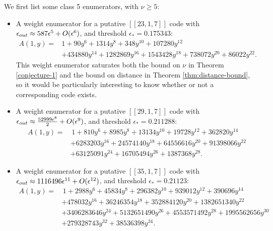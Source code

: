 \documentclass[11pt]{article}
\begin{document}
We first list some class 5 enumerators, with $\nu \geq 5$:
\begin{itemize}
    \item A weight enumerator for a putative $[[23,1,7]]$ code with $\epsilon_{\rm out} \approx  587 \epsilon ^5 +O(\epsilon^6)$, and threshold $\epsilon_*=0.175343$:
 \begin{equation}
    \begin{split}
    A(1, y) = & 1+90 y^6+1314 y^8+348 y^{10}+107280 y^{12} \\ & +434880
   y^{14}+1282869 y^{16}+1543428 y^{18}+738072
   y^{20}+86022 y^{22}.
    \end{split}
\end{equation}
    This weight enumerator saturates both the bound on $\nu$ in Theorem \ref{conjecture-1} and the bound on distance in Theorem \ref{thm:distance-bound}, so it would be particularly interesting to know whether or not a corresponding code exists.

 \item A weight enumerator for a putative $[[29,1,7]]$ code with $\epsilon_{\rm out} \approx  \frac{52999 \epsilon ^8}{2} +O(\epsilon^9)$, and threshold $\epsilon_*=0.211288$:
\begin{equation}
\begin{aligned}
    A(1, y) = & \, 1 + 810y^6 + 8985y^8 + 13134y^{10} + 19728y^{12} + 362820y^{14} \\
              & + 6283203y^{16} + 24574140y^{18} + 64556616y^{20} + 91398066y^{22} \\
              & + 63125091y^{24} + 16705494y^{26} + 1387368y^{28}.
\end{aligned}
\end{equation}


 \item A weight enumerator for a putative $[[35,1,7]]$ code with $\epsilon_{\rm out} \approx  1116496 \epsilon ^{11} +O(\epsilon^{12})$, and threshold $\epsilon_*=0.21123$:
\begin{equation}
\begin{aligned}
    A(1, y) = & \, 1 + 2988y^6 + 45834y^8 + 296382y^{10} + 939012y^{12} + 390696y^{14} \\
              & + 478032y^{16} + 36246354y^{18} + 352884120y^{20} + 1382651340y^{22} \\
              & + 3406283646y^{24} + 5132651490y^{26} + 4553571492y^{28} + 1995562656y^{30} \\
              & + 279328743y^{32} + 38536398y^{34}.
\end{aligned}
\end{equation}



\end{itemize}
\end{document}

